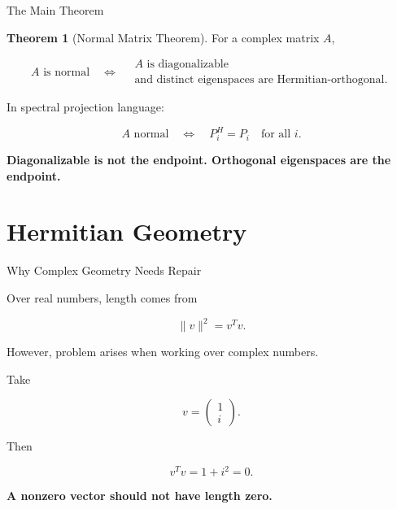\documentclass[10pt]{beamer}
\theoremstyle{definition}
\newtheorem{thm}{Theorem}[section]
\newcommand{\x}[1]{\alert{\textbf{#1}}}
\begin{document}
\begin{frame}[shrink=5]{The Main Theorem}

\begin{thm}[Normal Matrix Theorem]
For a complex matrix $A$,

$$
A\text{ is normal}
\quad\Longleftrightarrow\quad
\begin{array}{c}
A\text{ is diagonalizable}\\
\text{and distinct eigenspaces are Hermitian-orthogonal.}
\end{array}
$$
\end{thm}

\vfill

In spectral projection language:

$$
A\text{ normal}
\quad\Longleftrightarrow\quad
P_i^H=P_i\quad\text{for all }i.
$$

\vfill

\begin{center}
\x{Diagonalizable is not the endpoint. Orthogonal eigenspaces are the endpoint.}
\end{center}

\end{frame}

\section{Hermitian Geometry}

\begin{frame}{Why Complex Geometry Needs Repair}

Over real numbers, length comes from

$$
\|v\|^2=v^Tv.
$$

\vfill

However, problem arises when working over complex numbers.

\vfill

Take

$$
v=\begin{pmatrix}1\\ i\end{pmatrix}.
$$

Then

$$
v^Tv=1+i^2=0.
$$

\vfill

\begin{center}
\x{A nonzero vector should not have length zero.}
\end{center}

\end{frame}
\end{document}
